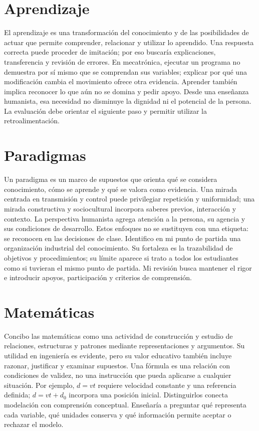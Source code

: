 \documentclass[spanish,letterpaper,oneside]{article}
\begin{document}
\section{Aprendizaje}
El aprendizaje es una transformación del conocimiento y de las posibilidades de actuar que permite comprender, relacionar y utilizar lo aprendido. Una respuesta correcta puede proceder de imitación; por eso buscaría explicaciones, transferencia y revisión de errores. En mecatrónica, ejecutar un programa no demuestra por sí mismo que se comprendan sus variables; explicar por qué una modificación cambia el movimiento ofrece otra evidencia.
Aprender también implica reconocer lo que aún no se domina y pedir apoyo. Desde una enseñanza humanista, esa necesidad no disminuye la dignidad ni el potencial de la persona. La evaluación debe orientar el siguiente paso y permitir utilizar la retroalimentación.
\section{Paradigmas}
Un paradigma es un marco de supuestos que orienta qué se considera conocimiento, cómo se aprende y qué se valora como evidencia. Una mirada centrada en transmisión y control puede privilegiar repetición y uniformidad; una mirada constructiva y sociocultural incorpora saberes previos, interacción y contexto. La perspectiva humanista agrega atención a la persona, su agencia y sus condiciones de desarrollo. Estos enfoques no se sustituyen con una etiqueta: se reconocen en las decisiones de clase.
Identifico en mi punto de partida una organización industrial del conocimiento. Su fortaleza es la trazabilidad de objetivos y procedimientos; su límite aparece si trato a todos los estudiantes como si tuvieran el mismo punto de partida. Mi revisión busca mantener el rigor e introducir apoyos, participación y criterios de comprensión.
\section{Matemáticas}
Concibo las matemáticas como una actividad de construcción y estudio de relaciones, estructuras y patrones mediante representaciones y argumentos. Su utilidad en ingeniería es evidente, pero su valor educativo también incluye razonar, justificar y examinar supuestos. Una fórmula es una relación con condiciones de validez, no una instrucción que pueda aplicarse a cualquier situación.
Por ejemplo, $d=vt$ requiere velocidad constante y una referencia definida; $d=vt+d_0$ incorpora una posición inicial. Distinguirlos conecta modelación con comprensión conceptual. Enseñaría a preguntar qué representa cada variable, qué unidades conserva y qué información permite aceptar o rechazar el modelo.
\end{document}
